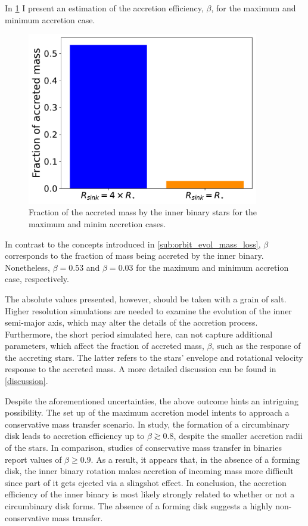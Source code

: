 In \cref{fig:accretion_eff_binary} I present an estimation of the accretion efficiency, $\beta$, for the maximum and minimum accretion case.
\begin{figure}[!htb]
    \centering
    \includegraphics[width=0.9\textwidth]{Thesis/graphs/accretion_case/accretion_binary_acc_efficiency.pdf}
    \caption{Fraction of the accreted mass by the inner binary stars for the maximum and minim accretion cases.}
    \label{fig:accretion_eff_binary}
\end{figure}
In contrast to the concepts introduced in \cref{sub:orbit_evol_mass_loss}, $\beta$ corresponds to the fraction of mass being accreted by the inner binary. Nonetheless, $\beta = 0.53$ and $\beta = 0.03$ for the maximum and minimum accretion case, respectively. 

The absolute values presented, however, should be taken with a grain of salt. Higher resolution simulations are needed to examine the evolution of the inner semi-major axis, which may alter the details of the accretion process. Furthermore, the short period simulated here, can not capture additional parameters, which affect the fraction of accreted mass, $\beta$, such as the response of the accreting stars. The latter refers to the stars' envelope and rotational velocity response to the accreted mass. A more detailed discussion can be found in \cref{discussion}.

Despite the aforementioned uncertainties, the above outcome hints an intriguing possibility. The set up of the maximum accretion model intents to approach a conservative mass transfer scenario.
In \cite{zwart2019triple} study, the formation of a circumbinary disk leads to accretion efficiency up to $\beta \gtrsim 0.8$, despite the smaller accretion radii of the stars. In comparison, studies of conservative mass transfer in binaries report values of $\beta \geq 0.9$. As a result, it appears that, in the absence of a forming disk, the inner binary rotation makes accretion of incoming mass more difficult since part of it gets ejected via a slingshot effect. In conclusion, the accretion efficiency of the inner binary is most likely strongly related to whether or not a circumbinary disk forms. The absence of a forming disk suggests a highly non-conservative mass transfer.


